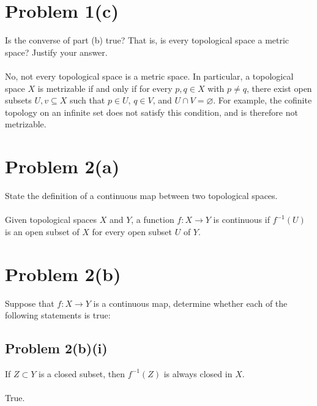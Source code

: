 \documentclass[12pt]{article}
\newenvironment{problem}
    {\begin{lrbox}{\mybox}\begin{minipage}{\textwidth-10pt}}
    {\end{minipage}\end{lrbox}\framebox[6.5in]{\usebox{\mybox}}}
\newenvironment{response}{\paragraph{}}{}
\let\emptyset\varnothing
\begin{document}
\section*{Problem 1(c)}
\begin{problem}
    Is the converse of part (b) true? That is, is every topological space a metric space? Justify your answer.
\end{problem}

\begin{response}
    No, not every topological space is a metric space. In particular, a topological space $X$ is metrizable if and only if for every $p,q\in X$ with $p\ne q$, there exist open subsets $U,v\subseteq X$ such that $p\in U$, $q\in V$, and $U\cap V=\emptyset$. For example, the cofinite topology on an infinite set does not satisfy this condition, and is therefore not metrizable.
\end{response}

\section*{Problem 2(a)}
\begin{problem}
    State the definition of a continuous map between two topological spaces.
\end{problem}

\begin{response}
    Given topological spaces $X$ and $Y$, a function $f:X\to Y$ is continuous if $f^{-1}(U)$ is an open subset of $X$ for every open subset $U$ of $Y$.
\end{response}

\section*{Problem 2(b)}
\begin{problem}
    Suppose that $f : X \to Y$ is a continuous map, determine whether each of the following statements is true:
\end{problem}

\subsection*{Problem 2(b)(i)}
\begin{problem}
    If $Z\subset Y$ is a closed subset, then $f^{-1}(Z)$ is always closed in $X$.
\end{problem}

\begin{response}
    True.
\end{response}
\end{document}
